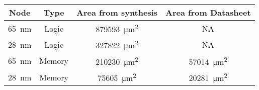 \begin{table}[h]
\begin{minipage}{1\textwidth}
    \begin{minipage}{0.65\textwidth}
        \vspace{5mm}
        \begin{adjustbox}{width=1\textwidth}
            \footnotesize
            \begin{tabular}{ |c|c|c|c|  }
              \hline
          Node  & Type      & Area from synthesis                                 & Area from Datasheet                                \\
              \hline
          \SI{65}{\nano\meter}  & Logic     & \SI[per-mode=symbol]{879593}{\square\micro\meter}  & NA\\ %
          \SI{28}{\nano\meter}  & Logic     & \SI[per-mode=symbol]{327822}{\square\micro\meter}  & NA\\ %
          \SI{65}{\nano\meter}  & Memory    & \SI[per-mode=symbol]{210230}{\square\micro\meter}  & \SI[per-mode=symbol]{57014}{\square\micro\meter}    \\
          \SI{28}{\nano\meter}  & Memory    & \SI[per-mode=symbol]{75605 }{\square\micro\meter}  & \SI[per-mode=symbol]{20281}{\square\micro\meter}    \\
              \hline
            \end{tabular}
        \end{adjustbox}
      \label{tab:Example design area}
    \end{minipage}
  \end{minipage}
  \captionsetup{justification=centering, skip=9pt}
  \vspace{0.0cm}
  \label{tab:Scaling runs}
\end{table}

